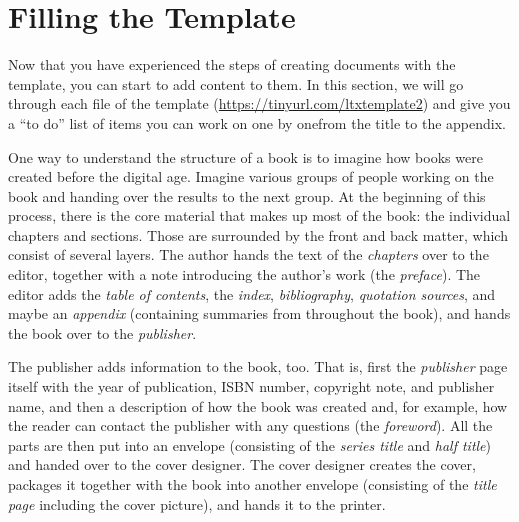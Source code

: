 

\section{Filling the Template}\label{fillingthetemplate:sec}

Now that you have experienced the steps of creating documents with the template, you can start to add content to them. In this section, we will go through each file of the template (\url{https://tinyurl.com/ltxtemplate2}) and give you a ``to do'' list of items you can work on one by one\emdash{}from the title to the appendix.

One way to understand the structure of a book is to imagine how books were created before the digital age. Imagine various groups of people working on the book and handing over the results to the next group. At the beginning of this process, there is the core material that makes up most of the book: the individual chapters and sections. Those are surrounded by the front and back matter, which consist of several layers. The author hands the text of the \textit{chapters} over to the editor, together with a note introducing the author's work (the \textit{preface}). The editor adds the \textit{table of contents}, the \textit{index}, \textit{bibliography}, \textit{quotation sources}, and maybe an \textit{appendix} (containing summaries from throughout the book), and hands the book over to the \textit{publisher}. 

The publisher adds information to the book, too. That is, first the \textit{publisher} page itself with the year of publication, ISBN number, copyright note, and publisher name, and then a description of how the book was created and, for example, how the reader can contact the publisher with any questions (the \textit{foreword}). All the parts are then put into an envelope (consisting of the \textit{series title} and \textit{half title}) and handed over to the cover designer. The cover designer creates the cover, packages it together with the book into another envelope (consisting of the \textit{title page} including the cover picture), and hands it to the printer. 

